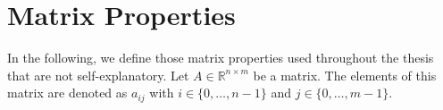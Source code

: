 \chapter{Matrix Properties}
\label{chap:appendixProperties}

In the following, we define those matrix properties used throughout the thesis that are not self-explanatory. Let $A \in \mathbb{R}^{n \times m}$ be a matrix. The elements of this matrix are denoted as $a_{ij}$ with $i \in \{0, \ldots, n-1\}$ and $j \in \{0, \ldots, m-1\}$.

%
%
%
%


